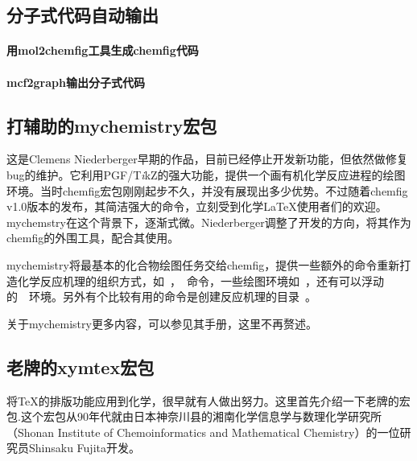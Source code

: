 \documentclass[a4paper,UTF8,zihao = -4]{ctexart} %
\providecommand{\tikzlg}{PGF/T\textit{i}kZ}
\begin{document}
\subsection{分子式代码自动输出}
\label{sec:OrgCompCodeOutput}


\paragraph{用\textsf{mol2chemfig}工具生成\textsf{chemfig}代码}


\paragraph{\textsf{mcf2graph}输出分子式代码}



\subsection{打辅助的\textsf{mychemistry}宏包}
\label{sec:mychemistry}

这是Clemens Niederberger早期的作品，目前已经停止开发新功能，但依然做修复bug的维护。它利用\tikzlg{}的强大功能，提供一个画有机化学反应进程的绘图环境。当时\textsf{chemfig}宏包刚刚起步不久，并没有展现出多少优势。不过随着\textsf{chemfig} \textsf{v}1.0版本的发布，其简洁强大的命令，立刻受到化学\LaTeX{}使用者们的欢迎。\textsf{mychemstry}在这个背景下，逐渐式微。Niederberger调整了开发的方向，将其作为\textsf{chemfig}的外围工具，配合其使用。

\textsf{mychemistry}将最基本的化合物绘图任务交给\textsf{chemfig}，提供一些额外的命令重新打造化学反应机理的组织方式，如~，~命令，一些绘图环境如~，还有可以浮动的~~环境。另外有个比较有用的命令是创建反应机理的目录~。

关于\textsf{mychemistry}更多内容，可以参见其手册，这里不再赘述。

\subsection{老牌的\textsf{xymtex}宏包}
\label{sec:xymtexIntro}

将\TeX{}的排版功能应用到化学，很早就有人做出努力。这里首先介绍一下老牌的\XyMTeX{}宏包.这个宏包从90年代就由日本神奈川县的湘南化学信息学与数理化学研究所（Shonan Institute of Chemoinformatics and Mathematical Chemistry）的一位研究员Shinsaku Fujita开发。
\end{document}
